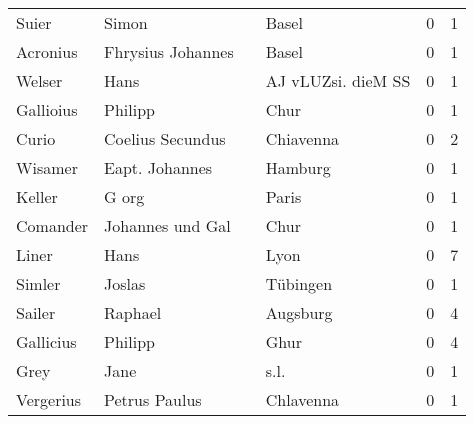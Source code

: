 \begin{tabular}{llllrr}
                    Suier &                              Simon &             &                                       Basel &          0 &         1 \\
                 Acronius &                  Fhrysius Johannes &             &                                       Basel &          0 &         1 \\
                   Welser &                               Hans &             &                          AJ vLUZsi. dieM SS &          0 &         1 \\
                Gallioius &                            Philipp &             &                                        Chur &          0 &         1 \\
                    Curio &                   Coelius Secundus &             &                                   Chiavenna &          0 &         2 \\
                  Wisamer &                     Eapt. Johannes &             &                                     Hamburg &          0 &         1 \\
                   Keller &                              G org &             &                                       Paris &          0 &         1 \\
                 Comander &                   Johannes und Gal &             &                                        Chur &          0 &         1 \\
                    Liner &                               Hans &             &                                        Lyon &          0 &         7 \\
                   Simler &                             Joslas &             &                                    Tübingen &          0 &         1 \\
                   Sailer &                            Raphael &             &                                    Augsburg &          0 &         4 \\
                Gallicius &                            Philipp &             &                                        Ghur &          0 &         4 \\
                     Grey &                               Jane &             &                                        s.l. &          0 &         1 \\
                Vergerius &                      Petrus Paulus &             &                                   Chlavenna &          0 &         1 \\

\end{tabular}
